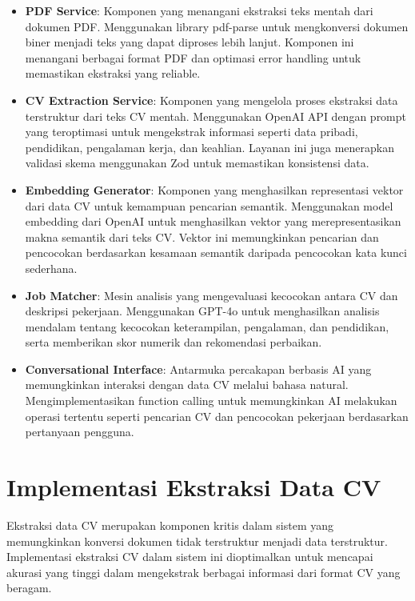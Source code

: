 \begin{itemize}
    \item \textbf{PDF Service}: Komponen yang menangani ekstraksi teks mentah dari dokumen PDF. Menggunakan library pdf-parse untuk mengkonversi dokumen biner menjadi teks yang dapat diproses lebih lanjut. Komponen ini menangani berbagai format PDF dan optimasi error handling untuk memastikan ekstraksi yang reliable.
    
    \item \textbf{CV Extraction Service}: Komponen yang mengelola proses ekstraksi data terstruktur dari teks CV mentah. Menggunakan OpenAI API dengan prompt yang teroptimasi untuk mengekstrak informasi seperti data pribadi, pendidikan, pengalaman kerja, dan keahlian. Layanan ini juga menerapkan validasi skema menggunakan Zod untuk memastikan konsistensi data.
    
    \item \textbf{Embedding Generator}: Komponen yang menghasilkan representasi vektor dari data CV untuk kemampuan pencarian semantik. Menggunakan model embedding dari OpenAI untuk menghasilkan vektor yang merepresentasikan makna semantik dari teks CV. Vektor ini memungkinkan pencarian dan pencocokan berdasarkan kesamaan semantik daripada pencocokan kata kunci sederhana.
    
    \item \textbf{Job Matcher}: Mesin analisis yang mengevaluasi kecocokan antara CV dan deskripsi pekerjaan. Menggunakan GPT-4o untuk menghasilkan analisis mendalam tentang kecocokan keterampilan, pengalaman, dan pendidikan, serta memberikan skor numerik dan rekomendasi perbaikan.
    
    \item \textbf{Conversational Interface}: Antarmuka percakapan berbasis AI yang memungkinkan interaksi dengan data CV melalui bahasa natural. Mengimplementasikan function calling untuk memungkinkan AI melakukan operasi tertentu seperti pencarian CV dan pencocokan pekerjaan berdasarkan pertanyaan pengguna.
\end{itemize}

\section{Implementasi Ekstraksi Data CV}
Ekstraksi data CV merupakan komponen kritis dalam sistem yang memungkinkan konversi dokumen tidak terstruktur menjadi data terstruktur. Implementasi ekstraksi CV dalam sistem ini dioptimalkan untuk mencapai akurasi yang tinggi dalam mengekstrak berbagai informasi dari format CV yang beragam.


